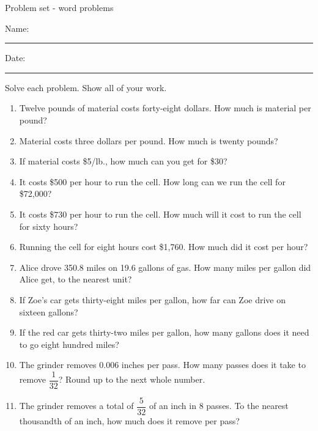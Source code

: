 \documentclass[12pt]{article}
\begin{document}
\pagestyle{empty} %
\begin{center}
          Problem set - word problems \\[0.5in]
\end{center}
Name: \rule{4in}{0.005in} Date: \rule{1.5in}{0.005in} 
  \vspace{0.25in}

Solve each problem. Show all of your work. 

\begin{enumerate}
		\newcommand{\spacing}{\vspace{0.70in}}
\item Twelve pounds of material costs forty-eight dollars. How much is material per pound? 
\spacing

\item Material costs three dollars per pound. How much is twenty pounds? 
\spacing

\item If material costs \$5/lb., how much can you get for \$30? 
\spacing

\item It costs \$500 per hour to run the cell. How long can we run the cell for \$72,000? 
\spacing

\item It costs \$730 per hour to run the cell. How much will it cost to run the cell for sixty hours? 
\spacing

\item Running the cell for eight hours cost \$1,760. How much did it cost per hour? 
\spacing

\item Alice drove 350.8 miles on 19.6 gallons of gas. How many miles per gallon did Alice get, to the nearest unit? 
\spacing

\item If Zoe's car gets thirty-eight miles per gallon, how far can Zoe drive on sixteen gallons? 
\spacing

\item If the red car gets thirty-two miles per gallon, how many gallons does it need to go eight hundred miles? 
\spacing

\item The grinder removes $0.006$ inches per pass. How many passes does it take to remove $\dfrac{1}{32}$? Round up to the next whole number. 
\spacing

\item The grinder removes a total of $\dfrac{5}{32}$ of an inch in 8 passes. To the nearest thousandth of an inch, how much does it remove per pass? 
\spacing


\end{enumerate}
\end{document}
